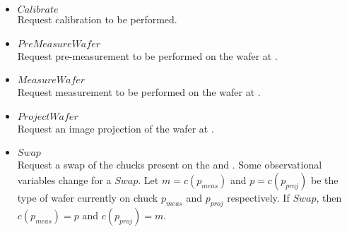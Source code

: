 \begin{itemize}
    \item $\mathit{Calibrate}$ \\
    Request calibration to be performed.

    \item $\mathit{PreMeasureWafer}$ \\
    Request pre-measurement to be performed on the wafer at \chuckIn.

    \item $\mathit{MeasureWafer}$ \\
    Request measurement to be performed on the wafer at \chuckMeas.

    \item $\mathit{ProjectWafer}$ \\
    Request an image projection of the wafer at \chuckProj.

    \item $\mathit{Swap}$ \\
    Request a swap of the chucks present on the \chuckMeas and \chuckProj.
    Some observational variables change for a $\mathit{Swap}$.
    Let $m = c\left(p_\mathit{meas}\right)$ and $p = c\left(p_\mathit{proj}\right)$ be the type of wafer currently on chuck $p_\mathit{meas}$ and $p_\mathit{proj}$ respectively.
    If $\mathit{Swap}$, then $c\left(p_\mathit{meas}\right) = p$ and $c\left(p_\mathit{proj}\right) = m$.
\end{itemize}

